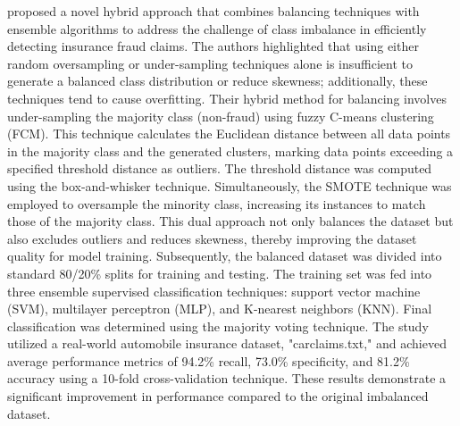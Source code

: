 \documentclass[twoside,11pt]{article}
\begin{document}
\begin{keywords}
\cite{Padhi2020} proposed a novel hybrid approach that combines balancing techniques with ensemble algorithms to address the challenge of class imbalance in efficiently detecting insurance fraud claims. The authors highlighted that using either random oversampling or under-sampling techniques alone is insufficient to generate a balanced class distribution or reduce skewness; additionally, these techniques tend to cause overfitting. Their hybrid method for balancing involves under-sampling the majority class (non-fraud) using fuzzy C-means clustering (FCM). This technique calculates the Euclidean distance between all data points in the majority class and the generated clusters, marking data points exceeding a specified threshold distance as outliers. The threshold distance was computed using the box-and-whisker technique. Simultaneously, the SMOTE technique was employed to oversample the minority class, increasing its instances to match those of the majority class. This dual approach not only balances the dataset but also excludes outliers and reduces skewness, thereby improving the dataset quality for model training. Subsequently, the balanced dataset was divided into standard 80/20\% splits for training and testing. The training set was fed into three ensemble supervised classification techniques: support vector machine (SVM), multilayer perceptron (MLP), and K-nearest neighbors (KNN). Final classification was determined using the majority voting technique. The study utilized a real-world automobile insurance dataset, "carclaims.txt," and achieved average performance metrics of 94.2\% recall, 73.0\% specificity, and 81.2\% accuracy using a 10-fold cross-validation technique. These results demonstrate a significant improvement in performance compared to the original imbalanced dataset.



\end{keywords}
\end{document}
